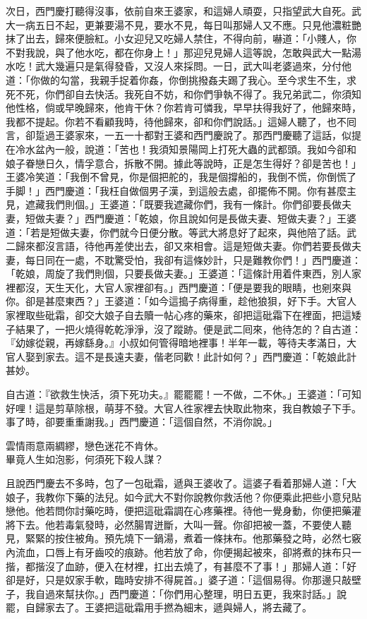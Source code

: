次日，西門慶打聽得沒事，依前自來王婆家，和這婦人頑耍，只指望武大自死。武大一病五日不起，更兼要湯不見，要水不見，每日叫那婦人又不應。只見他濃粧艷抹了出去，歸來便臉紅。小女迎兒又吃婦人禁住，不得向前，嚇道：「小賤人，你不對我說，與了他水吃，都在你身上！」那迎兒見婦人這等說，怎敢與武大一點湯水吃！武大幾遍只是氣得發昏，又沒人來採問。一日，武大叫老婆過來，分付他道：「你做的勾當，我親手捉着你姦，你倒挑撥姦夫踢了我心。至今求生不生，求死不死，你們卻自去快活。我死自不妨，和你們爭執不得了。我兄弟武二，你須知他性格，倘或早晚歸來，他肯干休？你若肯可憐我，早早扶得我好了，他歸來時，我都不提起。你若不看顧我時，待他歸來，卻和你們說話。」這婦人聽了，也不囘言，卻踅過王婆家來，一五一十都對王婆和西門慶說了。那西門慶聽了這話，似提在冷水盆內一般，說道：「苦也！我須知景陽岡上打死大蟲的武都頭。我如今卻和娘子眷戀日久，情孚意合，拆散不開。據此等說時，正是怎生得好？卻是苦也！」王婆冷笑道：「我倒不曾見，你是個把舵的，我是個撐船的，我倒不慌，你倒慌了手脚！」西門慶道：「我枉自做個男子漢，到這般去處，卻擺佈不開。你有甚麼主見，遮藏我們則個。」王婆道：「既要我遮藏你們，我有一條計。你們卻要長做夫妻，短做夫妻？」{}西門慶道：「乾娘，你且說如何是長做夫妻、短做夫妻？」王婆道：「若是短做夫妻，你們就今日便分散。等武大將息好了起來，與他陪了話。武二歸來都沒言語，待他再差使出去，卻又來相會。這是短做夫妻。你們若要長做夫妻，每日同在一處，不耽驚受怕，我卻有這條妙計，只是難教你們！」西門慶道：「乾娘，周旋了我們則個，只要長做夫妻。」王婆道：「這條計用着件東西，別人家裡都沒，天生天化，大官人家裡卻有。」西門慶道：「便是要我的眼睛，也剜來與你。卻是甚麼東西？」王婆道：「如今這搗子病得重，趁他狼狽，好下手。{}大官人家裡取些砒霜，卻交大娘子自去贖一帖心疼的藥來，卻把這砒霜下在裡面，把這矮子結果了，一把火燒得乾乾淨淨，沒了蹤跡。便是武二囘來，他待怎的？自古道：『幼嫁從親，再嫁繇身。』小叔如何管得暗地裡事！半年一載，等待夫孝滿日，大官人娶到家去。這不是長遠夫妻，偕老同歡！此計如何？」西門慶道：「乾娘此計甚妙。

自古道：『欲救生快活，須下死功夫。』罷罷罷！一不做，二不休。」王婆道：「可知好哩！這是剪草除根，萌芽不發。{}大官人徃家裡去快取此物來，我自教娘子下手。事了時，卻要重重謝我。」西門慶道：「這個自然，不消你說。」

\begin{myquote} 
雲情雨意兩綢繆，戀色迷花不肯休。\\畢竟人生如泡影，何須死下殺人謀？
\end{myquote} 

且說西門慶去不多時，包了一包砒霜，遞與王婆收了。這婆子看着那婦人道：「大娘子，我教你下藥的法兒。如今武大不對你說教你救活他？你便乘此把些小意兒貼戀他。他若問你討藥吃時，便把這砒霜調在心疼藥裡。待他一覺身動，你便把藥灌將下去。他若毒氣發時，必然腸胃迸斷，大叫一聲。你卻把被一蓋，不要使人聽見，緊緊的按住被角。{}預先燒下一鍋湯，煮着一條抹布。他那藥發之時，必然七竅內流血，口唇上有牙齒咬的痕跡。他若放了命，你便揭起被來，卻將煮的抹布只一揩，都揩沒了血跡，便入在材裡，扛出去燒了，有甚麼不了事！」那婦人道：「好卻是好，{}只是奴家手軟，臨時安排不得屍首。」婆子道：「這個易得。你那邊只敲壁子，我自過來幫扶你。」西門慶道：「你們用心整理，明日五更，我來討話。」說罷，自歸家去了。王婆把這砒霜用手撚為細末，遞與婦人，將去藏了。

